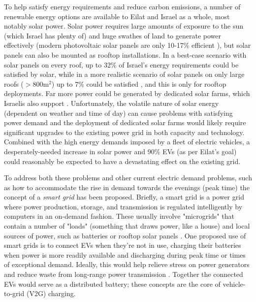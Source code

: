 \documentclass{article}                         %
\begin{document}
To help satisfy energy requirements and reduce carbon emissions, a number of renewable energy options are available to Eilat and Israel as a whole, most notably solar power. Solar power requires large amounts of exposure to the sun (which Israel has plenty of) and huge swathes of land to generate power effectively (modern photovoltaic solar panels are only 10-17\% efficient \cite{Zhu2015DistributedGrid}), but solar panels can also be mounted as rooftop installations. In a best-case scenario with solar panels on every roof, up to 32\% of Israel's energy requirements could be satisfied by solar, while in a more realistic scenario of solar panels on only large roofs ($>$800m$^2$) up to 7\% could be satisfied \cite{Vardimon2011AssessmentIsrael}, and this is only for rooftop deployments. Far more power could be generated by dedicated solar farms, which Israelis also support \cite{Dipersio2018PhotovoltaicAcceptance}. Unfortunately, the volatile nature of solar energy (dependent on weather and time of day) can cause problems with satisfying power demand \cite{Lu2015IntroductionPEVs} and the deployment of dedicated solar farms would likely require significant upgrades to the existing power grid \cite{Vardimon2011AssessmentIsrael} in both capacity and technology. Combined with the high energy demands imposed by a fleet of electric vehicles, a desperately-needed increase in solar power and 90\% EVs (as per Eilat's goal) could reasonably be expected to have a devastating effect on the existing grid.

To address both these problems and other current electric demand problems, such as how to accommodate the rise in demand towards the evenings (peak time) the concept of a \textit{smart grid} has been proposed. Briefly, a smart grid is a power grid where power production, storage, and transmission is regulated intelligently by computers in an on-demand fashion. These usually involve "microgrids" that contain a number of "loads" (something that draws power, like a house) and local sources of power, such as batteries or rooftop solar panels \cite{Lu2015IntroductionPEVs}. One proposed use of smart grids is to connect EVs when they're not in use, charging their batteries when power is more readily available and discharging during peak time \cite{Mahmud2015PowerEV} or times of exceptional demand. Ideally, this would help relieve stress on power generators and reduce waste from long-range power transmission \cite{Zhu2015DistributedGrid}. Together the connected EVs would serve as a distributed battery; these concepts are the core of vehicle-to-grid (V2G) charging.
\end{document}
